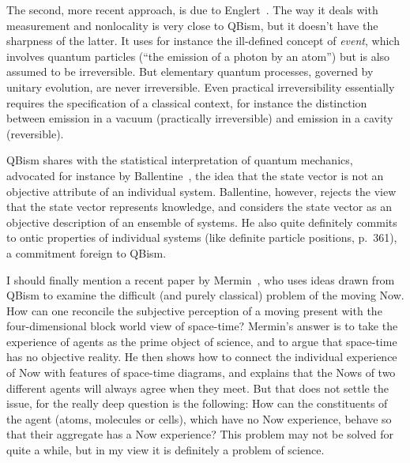\documentclass[12pt]{article}
\begin{document}
The second, more recent approach, is
due to Englert~\cite{englert}.  The way
it deals with measurement and nonlocality
is very close to QBism, but it doesn't
have the sharpness of the latter.  It
uses for instance the ill-defined concept
of \emph{event}, which involves quantum
particles (``the emission of a photon
by an atom'') but is also assumed to be
irreversible.  But elementary quantum
processes, governed by unitary evolution,
are never irreversible.  Even practical
irreversibility essentially requires
the specification of a classical context,
for instance the distinction between
emission in a vacuum (practically
irreversible) and emission in a cavity
(reversible).

QBism shares with the statistical
interpretation of quantum mechanics,
advocated for instance by
Ballentine~\cite{ballentine}, the idea
that the state vector is not an
objective attribute of an individual
system.  Ballentine, however, rejects
the view that the state vector represents
knowledge, and considers the state
vector as an objective description of
an ensemble of systems.  He also quite
definitely commits to ontic properties
of individual systems (like definite
particle positions, p.~361), a commitment
foreign to QBism.

I should finally mention a recent paper
by Mermin~\cite{mermin}, who uses ideas
drawn from QBism to examine the difficult
(and purely classical) problem of the moving
Now.  How can one reconcile the subjective
perception of a moving present with the
four-dimensional block world view of
space-time?  Mermin's answer is to
take the experience of agents as the
prime object of science, and to argue that
space-time has no objective reality.
He then shows how to connect the
individual experience of Now with
features of space-time diagrams, and explains
that the Nows of two different agents will
always agree when they meet.  But that
does not settle the issue, for
the really deep question is the
following: How can the constituents
of the agent (atoms, molecules or cells),
which have no Now experience, behave so
that their aggregate has a Now experience?
This problem may not be solved for quite a
while, but in my view it is definitely a
problem of science.
%
\end{document}
